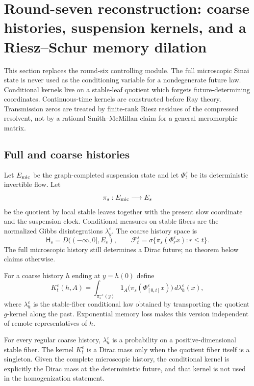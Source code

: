 \section{Round-seven reconstruction: coarse histories, suspension kernels, and a Riesz--Schur memory dilation}
\label{sec:r7-a4}

This section replaces the round-six controlling module.  The full microscopic
Sinai state is never used as the conditioning variable for a nondegenerate
future law.  Conditional kernels live on a stable-leaf quotient which forgets
future-determining coordinates.  Continuous-time kernels are constructed
before Ray theory.  Transmission zeros are treated by finite-rank Riesz
residues of the compressed resolvent, not by a rational Smith--McMillan claim
for a general meromorphic matrix.

\subsection{Full and coarse histories}

Let $E_{\rm mic}$ be the graph-completed suspension state and let
$\Phi_t^\varepsilon$ be its deterministic invertible flow.  Let
\[
 \pi_s:E_{\rm mic}\longrightarrow E_s
\]
be the quotient by local stable leaves together with the present slow
coordinate and the suspension clock.  Conditional measures on stable fibers
are the normalized Gibbs disintegrations $\lambda_y^\varepsilon$.  The coarse
history space is
\[
 \mathsf H_s=D(( -\infty,0],E_s),
 \qquad
 \mathcal F_t^s=\sigma\{\pi_s(\Phi_r^\varepsilon x):r\le t\}.
\]
The full microscopic history still determines a Dirac future; no theorem below
claims otherwise.

For a coarse history $h$ ending at $y=h(0)$ define
\[
 K_t^\varepsilon(h,A)=
 \int_{\pi_s^{-1}(y)}
  1_A\bigl(\pi_s(\Phi_{[0,t]}^\varepsilon x)\bigr)
  \,d\lambda_{h}^{\varepsilon}(x),
\]
where $\lambda_h^\varepsilon$ is the stable-fiber conditional law obtained by
transporting the quotient $g$-kernel along the past.  Exponential memory loss
makes this version independent of remote representatives of $h$.

\begin{lemma}
\label{lem:r7-a4-coarse}
For every regular coarse history, $\lambda_h^\varepsilon$ is a probability on
a positive-dimensional stable fiber.  The kernel $K_t^\varepsilon$ is a Dirac
mass only when the quotient fiber itself is a singleton.  Given the complete
microscopic history, the conditional kernel is explicitly the Dirac mass at
the deterministic future, and that kernel is not used in the homogenization
statement.
\end{lemma}

